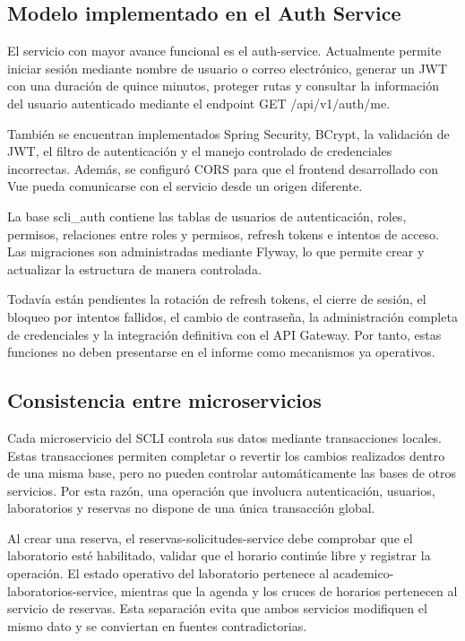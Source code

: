 \documentclass[conference]{IEEEtran}
\begin{document}
\subsection{Modelo implementado en el Auth Service}
El servicio con mayor avance funcional es el auth-service. Actualmente permite iniciar sesión mediante nombre de usuario o correo electrónico, generar un JWT con una duración de quince minutos, proteger rutas y consultar la información del usuario autenticado mediante el endpoint GET /api/v1/auth/me.

También se encuentran implementados Spring Security, BCrypt, la validación de JWT, el filtro de autenticación y el manejo controlado de credenciales incorrectas. Además, se configuró CORS para que el frontend desarrollado con Vue pueda comunicarse con el servicio desde un origen diferente.

La base scli\_auth contiene las tablas de usuarios de autenticación, roles, permisos, relaciones entre roles y permisos, refresh tokens e intentos de acceso. Las migraciones son administradas mediante Flyway, lo que permite crear y actualizar la estructura de manera controlada.

Todavía están pendientes la rotación de refresh tokens, el cierre de sesión, el bloqueo por intentos fallidos, el cambio de contraseña, la administración completa de credenciales y la integración definitiva con el API Gateway. Por tanto, estas funciones no deben presentarse en el informe como mecanismos ya operativos.

\subsection{Consistencia entre microservicios}
Cada microservicio del SCLI controla sus datos mediante transacciones locales. Estas transacciones permiten completar o revertir los cambios realizados dentro de una misma base, pero no pueden controlar automáticamente las bases de otros servicios. Por esta razón, una operación que involucra autenticación, usuarios, laboratorios y reservas no dispone de una única transacción global.

Al crear una reserva, el reservas-solicitudes-service debe comprobar que el laboratorio esté habilitado, validar que el horario continúe libre y registrar la operación. El estado operativo del laboratorio pertenece al academico-laboratorios-service, mientras que la agenda y los cruces de horarios pertenecen al servicio de reservas. Esta separación evita que ambos servicios modifiquen el mismo dato y se conviertan en fuentes contradictorias.
\end{document}
